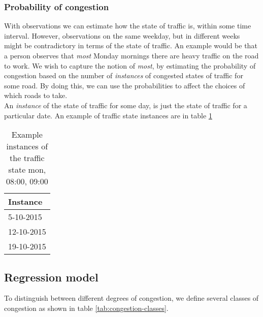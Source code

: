 \subsubsection{Probability of congestion}
With observations we can estimate how the state of traffic is, within some time interval. However, observations on the same weekday, but in different weeks might be contradictory in terms of the state of traffic. An example would be that a person observes that \emph{most} Monday mornings there are heavy traffic on the road to work. We wish to capture the notion of \emph{most}, by estimating the probability of congestion based on the number of \emph{instances} of congested states of traffic for some road. By doing this, we can use the probabilities to affect the choices of which roads to take.\\
An \emph{instance} of the state of traffic for some day, is just the state of traffic for a particular date. An example of traffic state instances are in table \ref{tab: traffic-state-instances}


\begin{table}[h]
\centering
\caption{Example instances of the traffic state mon, 08:00, 09:00}
\label{tab: traffic-state-instances}
\begin{tabular}{l}
\textbf{Instance} \\ \hline
5-10-2015         \\
12-10-2015        \\
19-10-2015       
\end{tabular}
\end{table}
\subsection{Regression model}


To distinguish between different degrees of congestion, 
we define several classes of congestion as shown in table \ref{tab:congestion-classes}. 

